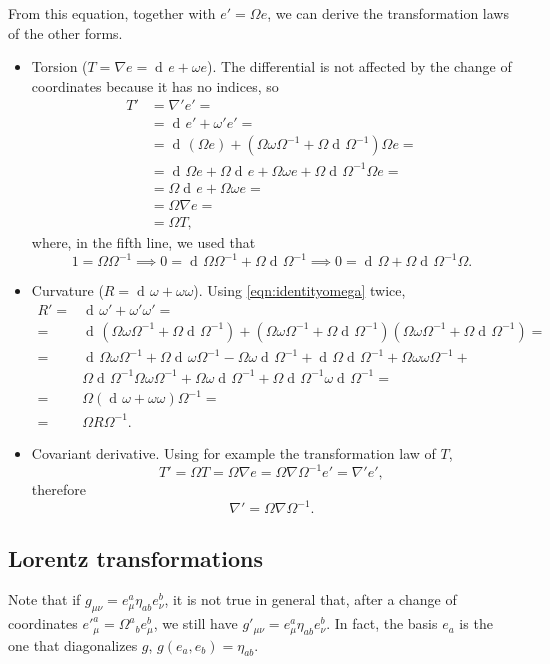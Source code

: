 \documentclass[a4paper,12pt]{book}
\newcommand{\dd}{\mathop{\mathrm{d}\!}{}}
\theoremstyle{definition}
\theoremstyle{remark}
\begin{document}
From this equation, together with $e'=\Omega e$, we can derive the transformation laws of the other forms.
\begin{itemize}
\item Torsion ($T=\nabla e=\dd e+\omega e$). The differential is not affected by the change of coordinates because it has no indices, so
\begin{align*}
T'&=\nabla' e'=\\
&=\dd e'+\omega' e'=\\
&=\dd(\Omega e)+(\Omega\omega\Omega^{-1}+\Omega\dd\Omega^{-1})\Omega e=\\
&=\dd\Omega e+\Omega\dd e+\Omega\omega e+\Omega\dd\Omega^{-1}\Omega e=\\
&=\Omega\dd e+\Omega\omega e=\\
&=\Omega\nabla e=\\
&=\Omega T,
\end{align*}
where, in the fifth line, we used that
\begin{equation}
1=\Omega\Omega^{-1}\implies0=\dd\Omega\Omega^{-1}+\Omega\dd\Omega^{-1}\implies 0=\dd\Omega+\Omega\dd\Omega^{-1}\Omega.
\label{eqn:identityomega}
\end{equation}
\item Curvature ($R=\dd\omega+\omega\omega$). Using \cref{eqn:identityomega} twice,
\begin{align*}
R'=&\dd\omega'+\omega'\omega'=\\
=&\dd(\Omega\omega\Omega^{-1}+\Omega\dd\Omega^{-1})+(\Omega\omega\Omega^{-1}+\Omega\dd\Omega^{-1})(\Omega\omega\Omega^{-1}+\Omega\dd\Omega^{-1})=\\
=&\dd\Omega\omega\Omega^{-1}+\Omega\dd\omega\Omega^{-1}-\Omega\omega\dd\Omega^{-1}+\dd\Omega\dd\Omega^{-1}+\Omega\omega\omega\Omega^{-1}+\\
&\Omega\dd\Omega^{-1}\Omega\omega\Omega^{-1}+\Omega\omega\dd\Omega^{-1}+\Omega\dd\Omega^{-1}\omega\dd\Omega^{-1}=\\
=&\Omega(\dd\omega+\omega\omega)\Omega^{-1}=\\
=&\Omega R\Omega^{-1}.
\end{align*}
\item Covariant derivative. Using for example the transformation law of $T$,
\[T'=\Omega T=\Omega\nabla e=\Omega\nabla\Omega^{-1}e'=\nabla'e',\]
therefore
\[\nabla'=\Omega\nabla\Omega^{-1}.\]
\end{itemize}

\subsection{Lorentz transformations}
Note that if $g_{\mu\nu}=e_\mu^a\eta_{ab}e_\nu^b$, it is not true in general that, after a change of coordinates $e'^a_\mu=\Omega^a{}_be^b_\mu$, we still have $g'_{\mu\nu}=e^a_\mu\eta_{ab}e^b_\nu$. In fact, the basis $e_a$ is the one that diagonalizes $g$, $g(e_a,e_b)=\eta_{ab}$.
\end{document}
